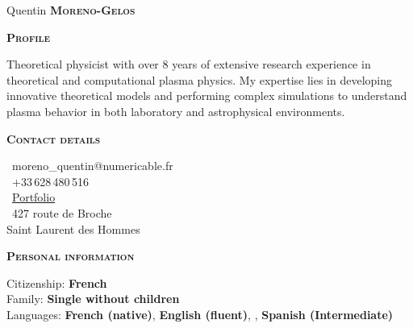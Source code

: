 \documentclass[12pt, a4paper]{article}
\newcommand{\headleft}[1]{\vspace*{3ex}\textsc{\textbf{#1}}\par%
    \vspace*{-1.5ex}\hrulefill\par\vspace*{0.7ex}}
\begin{document}
\setlength{\topskip}{0pt}
\setlength{\parindent}{0pt}
\setlength{\parskip}{0pt}
\setlength{\fboxsep}{0pt}
\pagestyle{empty}
\raggedbottom

\begin{minipage}[t]{0.36\textwidth} %
\colorbox{cvblue}{\begin{minipage}[t][5mm][t]{\textwidth}\null\hfill\null\end{minipage}}

\vspace{-.2ex} %
\colorbox{cvblue!90}{\color{white}  %
\textwidth\relax%
\begin{minipage}[t][293mm][t]{0.82\textwidth}
\raggedright
\vspace*{2.5ex}

\Large Quentin \textbf{\textsc{Moreno-Gelos}} \normalsize 



\vspace*{0.5ex} %

\headleft{Profile}

Theoretical physicist with over 8 years of extensive research experience in theoretical and computational plasma physics. 
My expertise lies in developing innovative theoretical models and performing complex simulations to understand plasma behavior in both laboratory and astrophysical environments. 

\headleft{Contact details}
\small %
\MVAt\ {\small moreno\_quentin@numericable.fr} \\[0.4ex]
\Mobilefone\ +33\,628\,480\,516 \\[0.5ex]
\Mundus\ \href{https://kantmg.github.io/Quentin-s_portfolio/}{Portfolio} \\[0.1ex]


\Letter\ 427 route de Broche\\
Saint Laurent des Hommes
\normalsize

\headleft{Personal information}
Citizenship: \textbf{French} \\[0.5ex]
Family: \textbf{Single without children} \\[0.5ex]
Languages: \textbf{French (native)}, \textbf{English (fluent)}, , \textbf{Spanish (Intermediate)}


\end{minipage}}
\end{minipage}
\end{document}
